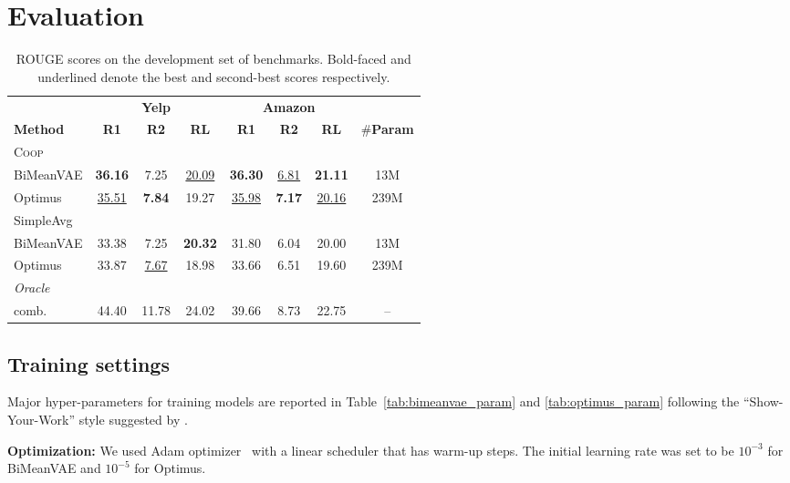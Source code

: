 \documentclass[11pt]{article}
\newcommand{\aggname}{\textsc{Coop}}
\newcommand{\name}{\mbox{\sc BiMeanVAE}}
\newcommand{\yelp}{\mbox{\bf Yelp}}
\newcommand{\amazon}{\mbox{\bf Amazon}}
\begin{document}
\section{Evaluation}

\begin{table*}[ht]
\centering
\begin{tabular}{lccccccc}\toprule
& \multicolumn{3}{c}{\yelp} & \multicolumn{3}{c}{\amazon} & \\
\textbf{Method} & \textbf{R1} & \textbf{R2} & \textbf{RL} & \textbf{R1} & \textbf{R2} & \textbf{RL} & \#\textbf{Param} \\\midrule
\aggname\\
\quad \name &\textbf{36.16} & 7.25 & \underline{20.09} & \textbf{36.30} & \underline{6.81} & \textbf{21.11} & 13M \\
\quad Optimus & \underline{35.51} & \textbf{7.84} & 19.27 & \underline{35.98} & \textbf{7.17} & \underline{20.16} & 239M \\\midrule
SimpleAvg\\
\quad \name & 33.38 & 7.25 & \textbf{20.32} & 31.80 & 6.04 & 20.00 & 13M \\
\quad Optimus & 33.87 & \underline{7.67} & 18.98 & 33.66 & 6.51 & 19.60 & 239M \\
\midrule
\textit{Oracle}\\
\quad comb. & 44.40 & 11.78 & 24.02 & 39.66 & 8.73 & 22.75 & -- \\
\bottomrule
\end{tabular}
\caption{ROUGE scores on the development set of benchmarks. Bold-faced and underlined denote the best and second-best scores respectively.
}\label{tab:dev_results}
\vspace{-0.2cm}
\end{table*}

\subsection{Training settings}
\label{app:exp_settings}
Major hyper-parameters for training models are reported in Table~\ref{tab:bimeanvae_param} and \ref{tab:optimus_param} following the ``Show-Your-Work'' style suggested by \citet{dodge-etal-2019-show}.

\noindent
{\bf Optimization:} We used Adam optimizer~\cite{kingma2015adam} with a linear scheduler that has warm-up steps. The initial learning rate was set to be $10^{-3}$ for \name{} and $10^{-5}$ for Optimus.
\end{document}
